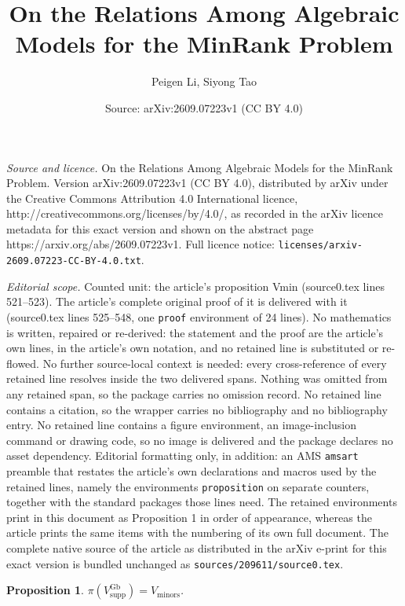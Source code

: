 \documentclass[10pt,a4paper]{amsart}
\title{On the Relations Among Algebraic Models for the MinRank Problem}
\author{Peigen Li, Siyong Tao}
\date{Source: arXiv:2609.07223v1 (CC BY 4.0)}
\newtheorem{proposition}{Proposition}
\newcommand{\tx}[1]{\text{#1}}
\begin{document}
\maketitle

\noindent\emph{Source and licence.} On the Relations Among Algebraic Models for the MinRank Problem. Version arXiv:2609.07223v1 (CC BY 4.0), distributed by arXiv under the Creative Commons Attribution 4.0 International licence, http://creativecommons.org/licenses/by/4.0/, as recorded in the arXiv licence metadata for this exact version and shown on the abstract page https://arxiv.org/abs/2609.07223v1. Full licence notice: \texttt{licenses/arxiv-2609.07223-CC-BY-4.0.txt}.\par\smallskip

\noindent\textit{Editorial scope.} Counted unit: the article's proposition Vmin (source0.tex lines 521--523). The article's complete original proof of it is delivered with it (source0.tex lines 525--548, one \texttt{proof} environment of 24 lines). No mathematics is written, repaired or re-derived: the statement and the proof are the article's own lines, in the article's own notation, and no retained line is substituted or re-flowed.  No further source-local context is needed: every cross-reference of every retained line resolves inside the two delivered spans.  Nothing was omitted from any retained span, so the package carries no omission record.  No retained line contains a citation, so the wrapper carries no bibliography and no bibliography entry.  No retained line contains a figure environment, an image-inclusion command or drawing code, so no image is delivered and the package declares no asset dependency.  Editorial formatting only, in addition: an AMS \texttt{amsart} preamble that restates the article's own declarations and macros used by the retained lines, namely the environments \texttt{proposition} on separate counters, together with the standard packages those lines need.  The retained environments print in this document as Proposition 1 in order of appearance, whereas the article prints the same items with the numbering of its own full document.  The complete native source of the article as distributed in the arXiv e-print for this exact version is bundled unchanged as \texttt{sources/209611/source0.tex}.
	\begin{proposition}\label{pro:Vsup and Vmin}
		$\pi(V^{\tx{Gb}}_{\tx{supp}})=V_{\tx{minors}}$.
	\end{proposition}
\end{document}
